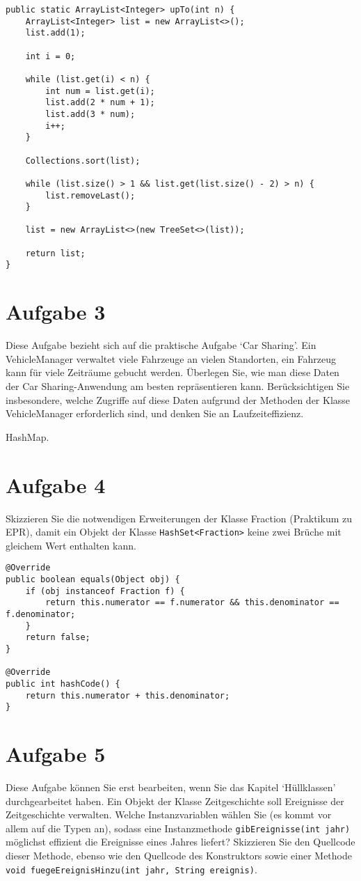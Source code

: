 \begin{lstlisting}
public static ArrayList<Integer> upTo(int n) {
    ArrayList<Integer> list = new ArrayList<>();
    list.add(1);

    int i = 0;

    while (list.get(i) < n) {
        int num = list.get(i);
        list.add(2 * num + 1);
        list.add(3 * num);
        i++;
    }

    Collections.sort(list);

    while (list.size() > 1 && list.get(list.size() - 2) > n) {
        list.removeLast();
    }

    list = new ArrayList<>(new TreeSet<>(list));

    return list;
}
\end{lstlisting}

\section{Aufgabe 3}

Diese Aufgabe bezieht sich auf die praktische Aufgabe `Car Sharing'. Ein
VehicleManager verwaltet viele Fahrzeuge an vielen Standorten, ein Fahrzeug
kann für viele Zeiträume gebucht werden. Überlegen Sie, wie man diese Daten der
Car Sharing-Anwendung am besten repräsentieren kann. Berücksichtigen Sie
insbesondere, welche Zugriffe auf diese Daten aufgrund der Methoden der Klasse
VehicleManager erforderlich sind, und denken Sie an Laufzeiteffizienz.

HashMap.

\section{Aufgabe 4}
Skizzieren Sie die notwendigen Erweiterungen der Klasse Fraction (Praktikum zu
EPR), damit ein Objekt der Klasse \lstinline{HashSet<Fraction>} keine zwei Brüche mit
gleichem Wert enthalten kann.

\begin{lstlisting}
@Override
public boolean equals(Object obj) {
    if (obj instanceof Fraction f) {
        return this.numerator == f.numerator && this.denominator == f.denominator;
    }
    return false;
}

@Override
public int hashCode() {
    return this.numerator + this.denominator;
}
\end{lstlisting}

\section{Aufgabe 5}
Diese Aufgabe können Sie erst bearbeiten, wenn Sie das Kapitel `Hüllklassen'
durchgearbeitet haben. Ein Objekt der Klasse Zeitgeschichte soll Ereignisse der
Zeitgeschichte verwalten. Welche Instanzvariablen wählen Sie (es kommt vor
allem auf die Typen an), sodass eine Instanzmethode
\lstinline{gibEreignisse(int jahr)} möglichst effizient die Ereignisse eines
Jahres liefert? Skizzieren Sie den Quellcode dieser Methode, ebenso wie den
Quellcode des Konstruktors sowie einer Methode 
\lstinline{void fuegeEreignisHinzu(int jahr, String ereignis)}.


